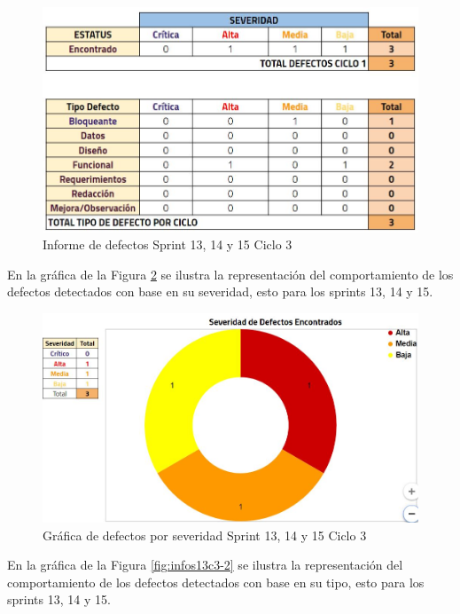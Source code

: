 \begin{figure}[H]
	\begin{center}
		\includegraphics[width=.95\textwidth]{images/pruebas/s13c3}
		\caption{Informe de defectos Sprint 13, 14 y 15  Ciclo 3}
		\label{fig:infos13c3}
	\end{center}
\end{figure}

En la gráfica de la Figura \ref{fig:infos13c3-1} se ilustra la representación del comportamiento de los defectos detectados con base en su severidad, esto para los sprints 13, 14 y 15.

\begin{figure}[H]
	\begin{center}
		\includegraphics[width=.75\textwidth]{images/pruebas/s13c3-1}
		\caption{Gráfica de defectos por severidad Sprint 13, 14 y 15  Ciclo 3}
		\label{fig:infos13c3-1}
	\end{center}
\end{figure}

En la gráfica de la Figura \ref{fig:infos13c3-2} se ilustra la representación del comportamiento de los defectos detectados con base en su tipo, esto para los sprints 13, 14 y 15.

